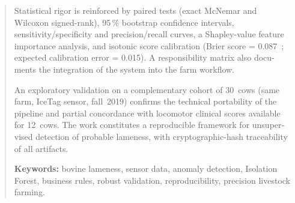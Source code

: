 \begin{otherlanguage}{english}
\begin{abstract}
Statistical rigor is reinforced by paired tests (exact McNemar and Wilcoxon
signed-rank), 95\,\% bootstrap confidence intervals, sensitivity/specificity and
precision/recall curves, a Shapley-value feature importance analysis, and isotonic
score calibration (Brier score = 0.087~; expected calibration error = 0.015). A
responsibility matrix also documents the integration of the system into the farm
workflow.

An exploratory validation on a complementary cohort of 30~cows (same farm, IceTag
sensor, fall~2019) confirms the technical portability of the pipeline and partial
concordance with locomotor clinical scores available for 12~cows. The work
constitutes a reproducible framework for unsupervised detection of probable lameness,
with cryptographic-hash traceability of all artifacts.

\vspace{1em}
\textbf{Keywords:} bovine lameness, sensor data, anomaly detection, Isolation Forest,
business rules, robust validation, reproducibility, precision livestock farming.
\end{abstract}
\end{otherlanguage}
